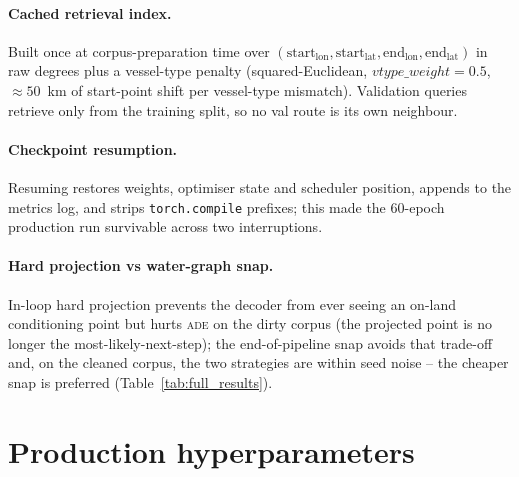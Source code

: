 \documentclass[oneside, a4paper, onecolumn, 11pt]{article}
\newcommand{\ade}{\textsc{ade}}
\begin{document}
\paragraph{Cached retrieval index.}
Built once at corpus-preparation time over
$(\mathrm{start}_{\mathrm{lon}}, \mathrm{start}_{\mathrm{lat}},
\mathrm{end}_{\mathrm{lon}}, \mathrm{end}_{\mathrm{lat}})$ in raw
degrees plus a vessel-type penalty (squared-Euclidean,
$\mathit{vtype\_weight}=0.5$, $\approx 50$~km of start-point shift
per vessel-type mismatch).  Validation queries retrieve only from
the training split, so no val route is its own neighbour.

\paragraph{Checkpoint resumption.}
Resuming restores weights, optimiser state and scheduler position,
appends to the metrics log, and strips \texttt{torch.compile}
prefixes; this made the 60-epoch production run survivable across
two interruptions.

\paragraph{Hard projection vs water-graph snap.}
In-loop hard projection prevents the decoder from ever seeing an
on-land conditioning point but hurts \ade{} on the dirty corpus
(the projected point is no longer the most-likely-next-step); the
end-of-pipeline snap avoids that trade-off and, on the cleaned
corpus, the two strategies are within seed noise -- the cheaper
snap is preferred (Table~\ref{tab:full_results}).

\section{Production hyperparameters}\label{app:hp}
\end{document}
